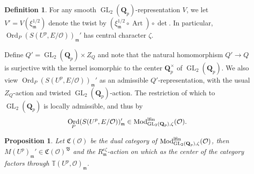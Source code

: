 \documentclass[leqno]{amsart}
\newcommand{\TT}{\mathbb{T}} %
\newcommand{\lfMod}{\textnormal{Mod}^{\textnormal{lfin}}}
\newcommand{\B}{\mathfrak B}
\newcommand{\fC}{\mathfrak C}
\DeclareMathOperator{\Ord}{Ord}
\DeclareMathOperator{\Art}{Art}
\DeclareMathOperator{\GL}{GL}
\newcommand{\Qp}{\mathbf{Q}_p}
\newcommand{\oo}{\mathcal{O}} %
\newcommand{\fm}{\mathfrak{m}}
\newtheorem{prop}[thm]{Proposition}
\theoremstyle{definition}
\newtheorem{defn}[thm]{Definition}
\theoremstyle{remark}
\begin{document}
\begin{defn}\label{def:twist}
	For any smooth $\GL_2(\Qp)$-representation
	$V$,
	we let $V'=V(\xi_{\fm}^{1/2})$
	denote the twist 
	by $(\xi_{\fm}^{1/2}\circ\Art)\circ \det$.
	In particular, 
	$\Ord_P(S(U^p,E/\oo))_{\fm}'$
	has central character $\zeta$.

	Define $Q'=\GL_2(\Qp)\times Z_Q$
	and note that the natural 
	homomorphism  $Q'\to Q$
	is surjective with the kernel
	isomorphic to the center  $\Qp^\times$
	of  $\GL_2(\Qp)$.
	We also view
	$\Ord_P(S(U^p,E/\oo))_{\fm}'$
	as an admissible $Q'$-representation,
	with the usual $Z_Q$-action
	and twisted $\GL_2(\Qp)$-action.
	The restriction of which to $\GL_2(\Qp)$
	is locally admissible,
	and thus by \cite[Thm 2.3.8]{emeI}
	\[
		\Ord_P(S(U^p,E/\oo))_{\fm}'\in \lfMod_{\GL_2(\Qp),\zeta}(\oo).
	\]
\end{defn}


\begin{prop}\label{prop:compatibility}
	Let $\fC(\oo)$ be the dual category of 
	$\lfMod_{\GL_2(\Qp),\zeta}(\oo)$, then 
	$M(U^p)_{\fm}'\in \fC(\oo)^{\B}$
	and the $R_\fm^{\epsilon\zeta}$-action on which
	as the center of the category
	factors through $\TT(U^p,\oo)_\fm$.
\end{prop}
\end{document}
